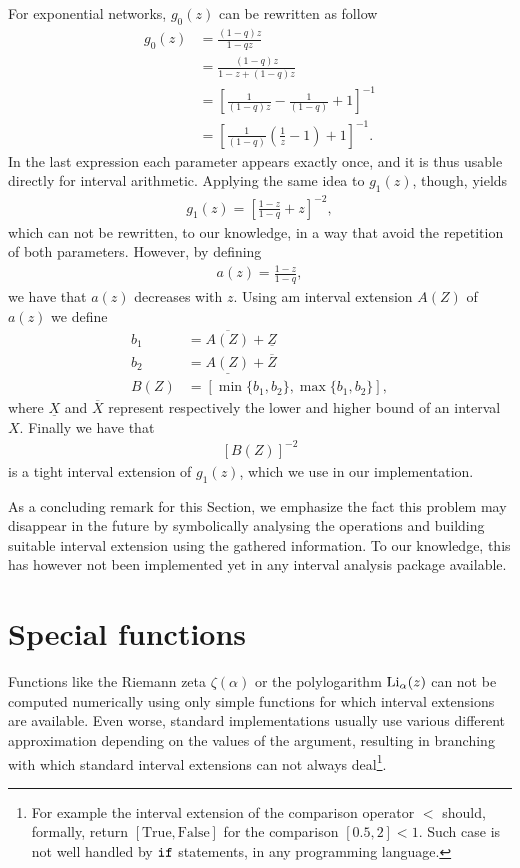 \documentclass[
11pt, %
american, %
singlespacing, %
final, %
nolistspacing, %
liststotoc, %
headsepline, %
]{MastersDoctoralThesis} %
\begin{document}
For exponential networks, $g_0(z)$ can be rewritten as follow
\begin{align}
	g_0(z) &= \frac{(1 - q) z}{1 - q z} \\
		&= \frac{(1 - q) z}{1 - z + (1 - q) z} \\
		&= \left[\frac{1}{(1 - q) z} - \frac{1}{(1 - q)} + 1\right]^{-1} \\
		&= \left[\frac{1}{(1 - q)} \left(\frac{1}{z} - 1\right) + 1\right]^{-1}.
\end{align}
In the last expression each parameter appears exactly once, and it is thus usable directly for interval arithmetic. Applying the same idea to $g_1(z)$, though, yields
\begin{align}
	g_1(z) = \left[ \frac{1 - z}{1 - q} + z\right]^{-2},
\end{align}
which can not be rewritten, to our knowledge, in a way that avoid the repetition of both parameters. However, by defining
\begin{align}
	a(z) = \frac{1 - z}{1 - q},
\end{align}
we have that $a(z)$ decreases with $z$. Using am interval extension $A(Z)$ of $a(z)$ we define
\begin{align}
	b_1 &= \overline{A(Z)} + \underline{Z} \\
	b_2 &= \underline{A(Z)} + \overline{Z} \\
	B(Z) &= [\min \{b_1, b_2\}, \max \{b_1, b_2\}],
\end{align}
where $\underline{X}$ and $\overline{X}$ represent respectively the lower and higher bound of an interval $X$. Finally we have that
\begin{align}
	\left[B(Z)\right]^{-2}
\end{align}
is a tight interval extension of $g_1(z)$, which we use in our implementation.

As a concluding remark for this Section, we emphasize the fact this problem may disappear in the future by symbolically analysing the operations and building suitable interval extension using the gathered information. To our knowledge, this has however not been implemented yet in any interval analysis package available.


\section{Special functions}

Functions like the Riemann zeta $\zeta(\alpha)$ or the polylogarithm $\mathrm{Li}_{\alpha}\!\left(z\right)$ can not be computed numerically using only simple functions for which interval extensions are available. Even worse, standard implementations usually use various different approximation depending on the values of the argument, resulting in branching with which standard interval extensions can not always deal\footnote{For example the interval extension of the comparison operator $<$ should, formally, return $[\text{True}, \text{False}]$ for the comparison $[0.5, 2] < 1$. Such case is not well handled by $\texttt{if}$ statements, in any programming language.}.
\end{document}
